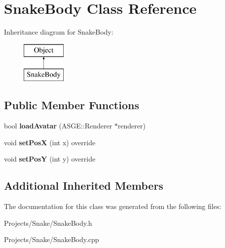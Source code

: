 \hypertarget{class_snake_body}{}\section{Snake\+Body Class Reference}
\label{class_snake_body}
Inheritance diagram for Snake\+Body\+:\begin{figure}[H]
\begin{center}
\leavevmode
\includegraphics[height=2.000000cm]{class_snake_body}
\end{center}
\end{figure}
\subsection*{Public Member Functions}
\begin{DoxyCompactItemize}
\item 
\mbox{\label{class_snake_body_aa2ae5086ef23bed90c1fa79b8099890a}} 
bool {\bfseries load\+Avatar} (A\+S\+G\+E\+::\+Renderer $\ast$renderer)
\item 
\mbox{\label{class_snake_body_aed6b73a5068b8c3c3cee84fdd8361782}} 
void {\bfseries set\+PosX} (int x) override
\item 
\mbox{\label{class_snake_body_adf2a27d12e65237dc7e1e154ad7f32c8}} 
void {\bfseries set\+PosY} (int y) override
\end{DoxyCompactItemize}
\subsection*{Additional Inherited Members}


The documentation for this class was generated from the following files\+:\begin{DoxyCompactItemize}
\item 
Projects/\+Snake/Snake\+Body.\+h\item 
Projects/\+Snake/Snake\+Body.\+cpp\end{DoxyCompactItemize}
